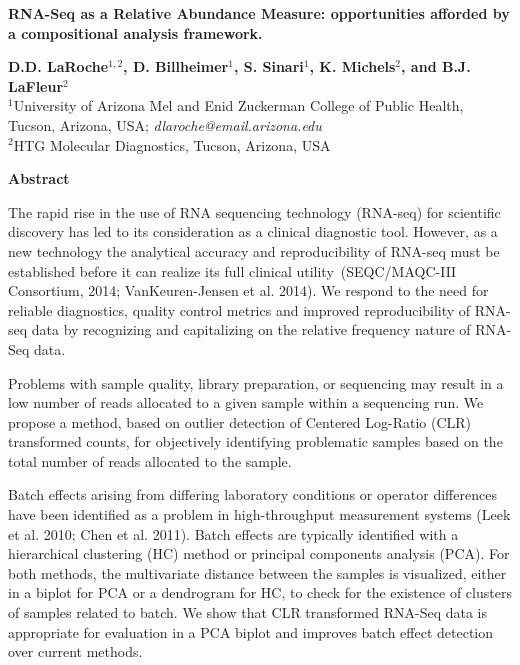 \documentclass [10pt]{article}\usepackage[]{graphicx}\usepackage[]{color}
\begin{document}
\begin{center}
\textbf{\large RNA-Seq as a Relative Abundance Measure: opportunities afforded by a compositional analysis framework.}

\vskip 0.25cm

\textbf{D.D. LaRoche}$^{1,2}$\textbf{, D. Billheimer}$^{1}$\textbf{, S. Sinari}$^{1}$\textbf{, K. Michels}$^{2}$\textbf{, and
B.J. LaFleur}$^{2}$ \\
{\small $^{1}$University of Arizona Mel and Enid Zuckerman College of Public Health, Tucson, Arizona, USA;
\textit{dlaroche@email.arizona.edu} \\
$^{2}$HTG Molecular Diagnostics, Tucson, Arizona, USA \\
}
\end{center}

\vskip 0.5cm {\centerline{\bf Abstract}}

The rapid rise in the use of RNA sequencing technology (RNA-seq) for scientific discovery has led to its consideration as a clinical diagnostic tool. However, as a new technology the analytical accuracy and reproducibility of RNA-seq must be established before it can realize its full clinical utility~(SEQC/MAQC-III Consortium, 2014; VanKeuren-Jensen et al. 2014). We respond to the need for reliable diagnostics, quality control metrics and improved reproducibility of RNA-seq data by recognizing and capitalizing on the relative frequency nature of RNA-Seq data.  
% 

Problems with sample quality, library preparation, or sequencing may result in a low number of reads allocated to a given sample within a sequencing run. We propose a method, based on outlier detection of Centered Log-Ratio (CLR) transformed counts, for objectively identifying problematic samples based on the total number of reads allocated to the sample. 

Batch effects arising from differing laboratory conditions or operator differences have been identified as a problem in high-throughput measurement systems (Leek et al. 2010; Chen et al. 2011).  Batch effects are typically identified with a hierarchical clustering (HC) method or principal components analysis (PCA).  For both methods, the multivariate distance between the samples is visualized, either in a biplot for PCA or a dendrogram for HC, to check for the existence of clusters of samples related to batch. We show that CLR transformed RNA-Seq data is appropriate for evaluation in a PCA biplot and improves batch effect detection over current methods.
\end{document}
